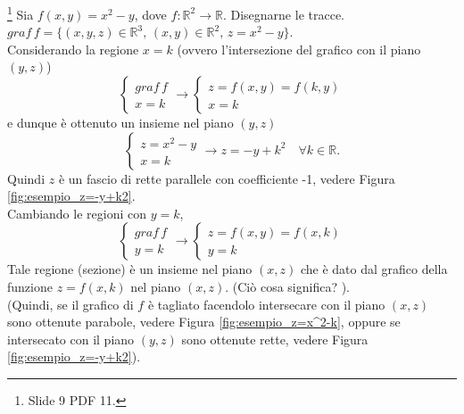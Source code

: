 \begin{example}\footnote{Slide 9 PDF 11.}\label{example:disegnare_tracce_x^2-y}
    Sia $f(x,y)=x^2-y$, dove $f\colon\mathbb R^2\rightarrow\mathbb R$. Disegnarne le tracce.\\
    $graf\,f=\{(x,y,z)\in\mathbb R^3,\, (x,y)\in\mathbb R^2,\, z=x^2-y\}$.\\
    Considerando la regione $x=k$ (ovvero l'intersezione del grafico con il piano $(y,z)$)
    \begin{equation}\label{eq:esempio_intersezione_piano_y_z}
        \begin{cases}
            graf\, f\\
            x=k
        \end{cases}\rightarrow
        \begin{cases}
            z=f(x,y)=f(k,y)\\
            x=k
        \end{cases}
    \end{equation}
    \footnotemark e dunque è ottenuto un insieme nel piano $(y,z)$
    \begin{equation}\label{eq:fascio_rette_nel_piano}
        \begin{cases}
            z=x^2-y\\
            x=k
        \end{cases}\longrightarrow z=-y+k^2\quad \forall k\in\mathbb R.
    \end{equation}
    Quindi $z$ è un fascio di rette parallele con coefficiente -1, vedere Figura \ref{fig:esempio_z=-y+k2}. \footnotemark\\
    Cambiando le regioni con $y=k$,
    \begin{equation}\label{eq:esempio_intersezione_piano_x_z}
        \begin{cases}
            graf\, f\\
            y=k
        \end{cases}\rightarrow
        \begin{cases}
            z=f(x,y)=f(x,k)\\
            y=k
        \end{cases}
    \end{equation}
    Tale regione (sezione) è un insieme nel piano $(x,z)$ che è dato dal grafico della funzione $z=f(x,k)$ nel piano $(x,z)$. (Ciò cosa significa? \footnotemark).\\
    (Quindi, se il grafico di $f$ è tagliato facendolo intersecare con il piano $(x,z)$ sono ottenute parabole, vedere Figura \ref{fig:esempio_z=x^2-k}, oppure se intersecato con il piano $(y,z)$ sono ottenute rette, vedere Figura \ref{fig:esempio_z=-y+k2}).\\

\end{example}
